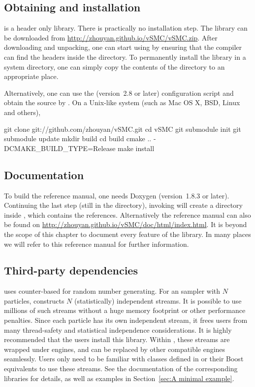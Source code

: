 \subsection{Obtaining and installation}

\vsmc is a header only library. There is practically no installation step. The
library can be downloaded from \url{http://zhouyan.github.io/vSMC/vSMC.zip}.
After downloading and unpacking, one can start using \vsmc by ensuring that
the compiler can find the headers inside the  directory. To
permanently install the library in a system directory, one can simply copy the
contents of the  directory to an appropriate place.

Alternatively, one can use the \cmake (version~2.8 or later) configuration
script and obtain the source by \git. On a Unix-like system (such as Mac OS X,
BSD, Linux and others),
\begin{shcode}
git clone git://github.com/zhouyan/vSMC.git
cd vSMC
git submodule init
git submodule update
mkdir build
cd build
cmake .. -DCMAKE_BUILD_TYPE=Release
make install
\end{shcode}

\subsection{Documentation}

To build the reference manual, one needs Doxygen (version~1.8.3 or later).
Continuing the last step (still in the  directory), invoking
 will create a  directory inside
, which contains the \html references. Alternatively the
reference manual can also be found on
\url{http://zhouyan.github.io/vSMC/doc/html/index.html}. It is beyond the
scope of this chapter to document every feature of the \vsmc library. In many
places we will refer to this reference manual for further information.

\subsection{Third-party dependencies}

\vsmc uses \random \cite{Salmon:2011um} counter-based \rng for random number
generating. For an \smc sampler with $N$ particles, \vsmc constructs $N$
(statistically) independent \rng streams. It is possible to use millions of
such streams without a huge memory footprint or other performance penalties.
Since each particle has its own independent \rng stream, it frees users from
many thread-safety and statistical independence considerations. It is highly
recommended that the users install this library. Within \vsmc, these \rng
streams are wrapped under \cppoo{} \rng engines, and can be replaced by other
compatible \rng engines seamlessly. Users only need to be familiar with
classes defined in \cppoo{}  or their Boost equivalents to
use these \rng streams. See the documentation of the corresponding libraries
for details, as well as examples in Section~\ref{sec:A minimal example}.

